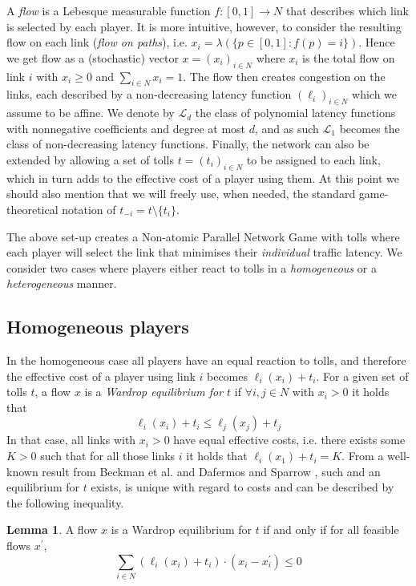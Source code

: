 \documentclass[10pt,a4paper]{book}
\theoremstyle{definition}
\newtheorem{lemma}[definition]{Lemma}
\theoremstyle{comment}
\begin{document}
A \textit{flow} is a Lebesque measurable function $f: [0, 1] \rightarrow N$ that describes which link is selected by each player.
It is more intuitive, however, to consider the resulting flow on each link (\textit{flow on paths}), i.e. $x_i = \lambda(\{p \in [0, 1]: f(p) = i\})$.
Hence we get flow as a (stochastic) vector $x = (x_i)_{i \in N}$ where $x_i$ is the total flow on link $i$ with $x_i \geq 0$ and $\sum_{i \in N}x_i = 1$.
The flow then creates congestion on the links, each described by a non-decreasing latency function $(\ell_i)_{i \in N}$ which we assume to be affine.
We denote by $\mathcal{L}_d$ the class of polynomial latency functions with nonnegative coefficients and degree at most $d$, and as such $\mathcal{L}_1$ becomes the class of non-decreasing latency functions.
Finally, the network can also be extended by allowing a set of tolls $t = (t_i)_{i \in N}$ to be assigned to each link, which in turn adds to the effective cost of a player using them.
At this point we should also mention that we will freely use, when needed, the standard game-theoretical notation of $t_{-i} = t \setminus \{t_i\}$.

The above set-up creates a Non-atomic Parallel Network Game with tolls where each player will select the link that minimises their \textit{individual} traffic latency.
We consider two cases where players either react to tolls in a \textit{homogeneous} or a \textit{heterogeneous} manner.

\subsection*{Homogeneous players}

In the homogeneous case all players have an equal reaction to tolls, and therefore the effective cost of a player using link $i$ becomes $\ell_i(x_i) + t_i$.
For a given set of tolls $t$, a flow $x$ is a \textit{Wardrop equilibrium for $t$} if $\forall i, j \in N$ with $x_i > 0$ it holds that
\begin{equation*}
	\ell_i(x_i) + t_i \leq \ell_j(x_j) + t_j
\end{equation*}
In that case, all links with $x_i > 0$ have equal effective costs, i.e. there exists some $K > 0$ such that for all those links $i$ it holds that $\ell_i(x_1) + t_i = K$.
From a well-known result from Beckman et al. \cite{beckmann1956studies} and Dafermos and Sparrow \cite{1363388843888284416}, such and an equilibrium for $t$ exists, is unique with regard to costs and can be described by the following inequality.
\begin{lemma}
	\label{lemma:wardrop_equilibrium}
	A flow $x$ is a Wardrop equilibrium for $t$ if and only if for all feasible flows $x^\prime$,
	\[\sum_{i \in N} (\ell_i(x_i) + t_i) \cdot (x_i - x_i^\prime) \leq 0\]
\end{lemma}
\end{document}
